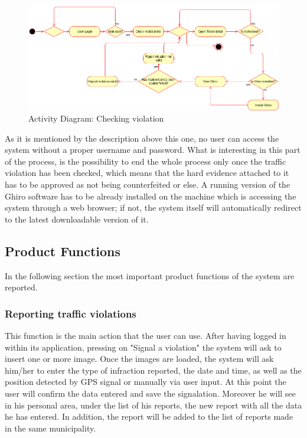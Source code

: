 \documentclass{article}
\begin{document}
\begin{figure}[H]
    \centering
    \includegraphics[scale=0.36]{Images/ActivityCheckViolation}
    \caption{Activity Diagram: Checking violation}
\end{figure}

As it is mentioned by the description above this one, no user can access the
system without a proper username and password. What is interesting in this part
of the process, is the possibility to end the whole process only once the
traffic violation has been checked, which means that the hard evidence attached
to it has to be approved as not being counterfeited or else. A running version
of the Ghiro software has to be already installed on the machine which is
accessing the system through a web browser; if not, the system itself will
automatically redirect to the latest downloadable version of it. 

\subsection{Product Functions}
In the following section the most important product functions of the system are
reported.
    \subsubsection{Reporting traffic violations}
    This function is the main action that the user can use. After having logged
    in within its application, pressing on "Signal a violation" the system will
    ask to insert one or more image. Once the images are loaded, the system will
    ask him/her to enter the type of infraction reported, the date and time, as
    well as the position detected by GPS signal or manually via user input. At
    this point the user will confirm the data entered and save the signalation.
    Moreover he will see in his personal area, under the list of his reports,
    the new report with all the data he has entered. In addition, the report
    will be added to the list of reports made in the same municipality.
\end{document}
